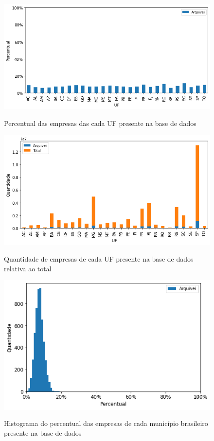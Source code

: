 \begin{figure}[htb]
    \centering
    \caption{Percentual das empresas das cada UF presente na base de dados}
    \includegraphics[scale=0.7]{images/base-de-dados-2.1-presenca-por-uf.png}
    \label{fig:base-de-dados:descritiva-2.1-presenca-por-uf}
    \fautor
\end{figure}

\begin{figure}[htb]
    \centering
    \caption{Quantidade de empresas de cada UF presente na base de dados relativa ao total}
    \includegraphics[scale=0.7]{images/base-de-dados-2.2-qtde-por-uf.png}
    \label{fig:base-de-dados:descritiva-2.2-qtde-por-uf}
    \fautor
\end{figure}

\begin{figure}[htb]
    \centering
    \caption{Histograma do percentual das empresas de cada município brasileiro presente na base de dados}
    \includegraphics[scale=0.7]{images/base-de-dados-3.1-presenca-por-mun.png}
    \label{fig:base-de-dados:descritiva-3.1-presenca-por-mun}
    \fautor
\end{figure}

